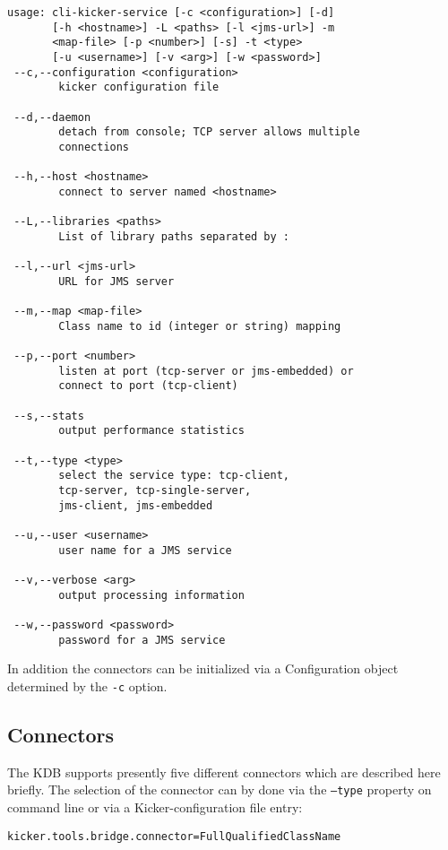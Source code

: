 \documentclass[11pt,a4paper]{article}
\begin{document}
\begin{lstlisting}[caption=Command line options of the Kicker Data Bridge]
usage: cli-kicker-service [-c <configuration>] [-d] 
       [-h <hostname>] -L <paths> [-l <jms-url>] -m
       <map-file> [-p <number>] [-s] -t <type>
       [-u <username>] [-v <arg>] [-w <password>]
 --c,--configuration <configuration>
        kicker configuration file

 --d,--daemon
        detach from console; TCP server allows multiple 
        connections

 --h,--host <hostname>
        connect to server named <hostname>

 --L,--libraries <paths>
        List of library paths separated by :

 --l,--url <jms-url>
        URL for JMS server

 --m,--map <map-file>
        Class name to id (integer or string) mapping

 --p,--port <number>
        listen at port (tcp-server or jms-embedded) or
        connect to port (tcp-client)

 --s,--stats
        output performance statistics

 --t,--type <type>
        select the service type: tcp-client,
        tcp-server, tcp-single-server, 
        jms-client, jms-embedded

 --u,--user <username>
        user name for a JMS service

 --v,--verbose <arg>
        output processing information

 --w,--password <password>
        password for a JMS service
\end{lstlisting}

\noindent
In addition the connectors can be initialized via a Configuration object determined by the \texttt{-c} option.

%
\subsection{Connectors}

The KDB supports presently five different connectors which are described here briefly. The selection of the connector can by done via the \texttt{--type} property on command line or via a Kicker-configuration file entry:

\begin{verbatim}
kicker.tools.bridge.connector=FullQualifiedClassName
\end{verbatim}
\end{document}
